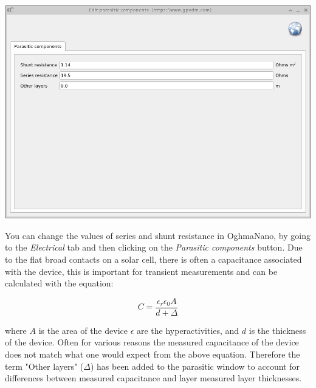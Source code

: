 \begin{minipage}[]{0.45\linewidth}
\centering
\includegraphics[width=\textwidth,height=0.7\textwidth]{./images/running/parasitic.png}
\label{fig:parasitic}
\end{minipage}


You can change the values of series and shunt resistance in OghmaNano, by going to the \emph{Electrical} tab and then clicking on the \emph{Parasitic components} button. Due to the flat broad contacts on a solar cell, there is often a capacitance associated with the device, this is important for transient measurements and can be calculated with the equation:

\begin{equation}
C=\frac{\epsilon_r \epsilon_0 A}{d+\Delta}
\end{equation}

where $A$ is the area of the device $\epsilon$ are the hyperactivities, and $d$ is the thickness of the device.  Often for various reasons the measured capacitance of the device does not match what one would expect from the above equation. Therefore the term "Other layers" ($\Delta$) has been added to the parasitic window to account for differences between measured capacitance and layer measured layer thicknesses.

\vspace*{\fill}


